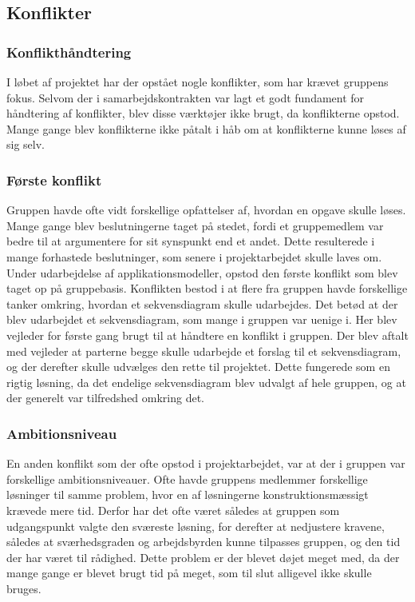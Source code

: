 \subsection{Konflikter}
\subsubsection{Konflikthåndtering}
I løbet af projektet har der opstået nogle konflikter, som har krævet gruppens fokus. Selvom der i samarbejdskontrakten var lagt et godt fundament for håndtering af konflikter, blev disse værktøjer ikke brugt, da konflikterne opstod. Mange gange blev konflikterne ikke påtalt i håb om at konflikterne kunne løses af sig selv. 

\subsubsection{Første konflikt}
Gruppen havde ofte vidt forskellige opfattelser af, hvordan en opgave skulle løses. Mange gange blev beslutningerne taget på stedet, fordi et gruppemedlem var bedre til at argumentere for sit synspunkt end et andet. Dette resulterede i mange forhastede beslutninger, som senere i projektarbejdet skulle laves om. Under udarbejdelse af applikationsmodeller, opstod den første konflikt som blev taget op på gruppebasis. Konflikten bestod i at flere fra gruppen havde 
forskellige tanker omkring, hvordan et sekvensdiagram skulle udarbejdes. Det betød at der blev udarbejdet et sekvensdiagram, som mange i gruppen var uenige i. Her blev vejleder for første gang brugt til at håndtere en konflikt i gruppen. Der blev aftalt med vejleder at parterne begge skulle udarbejde et forslag til et sekvensdiagram, og der derefter skulle udvælges den rette til projektet. Dette fungerede som en rigtig løsning, da det endelige sekvensdiagram blev udvalgt af hele gruppen, og at der generelt var tilfredshed omkring det.

\subsubsection{Ambitionsniveau}
En anden konflikt som der ofte opstod i projektarbejdet, var at der i gruppen var forskellige ambitionsniveauer. Ofte havde gruppens medlemmer forskellige løsninger til samme problem, hvor en af løsningerne konstruktionsmæssigt krævede mere tid. Derfor har det ofte været således at gruppen som udgangspunkt valgte den sværeste løsning, for derefter at nedjustere kravene, således at sværhedsgraden og arbejdsbyrden kunne tilpasses gruppen, og den tid der har været til rådighed. Dette problem er der blevet døjet meget med, da der mange gange er blevet brugt tid på meget, som til slut alligevel ikke skulle bruges. 

